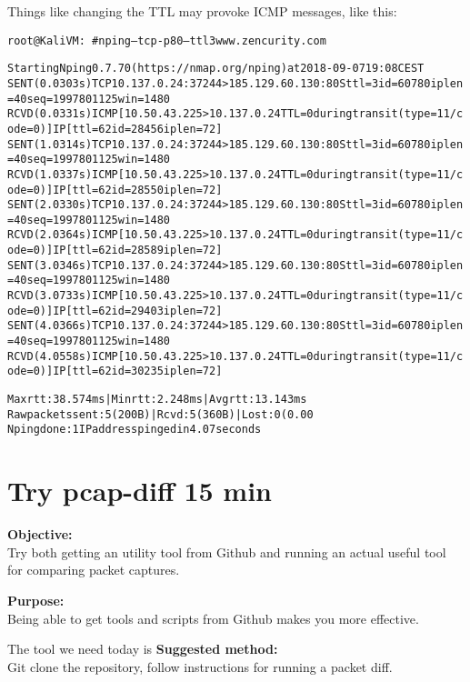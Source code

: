 \documentclass[a4paper,11pt,notitlepage]{report}
\begin{document}
\eject
Things like changing the TTL may provoke ICMP messages, like this:
\begin{alltt}\footnotesize
root@KaliVM:~# nping --tcp -p 80 --ttl 3 www.zencurity.com

Starting Nping 0.7.70 ( https://nmap.org/nping ) at 2018-09-07 19:08 CEST
SENT (0.0303s) TCP 10.137.0.24:37244 > 185.129.60.130:80 S ttl=3 id=60780 iplen=40  seq=1997801125 win=1480
RCVD (0.0331s) ICMP [10.50.43.225 > 10.137.0.24 TTL=0 during transit (type=11/code=0) ] IP [ttl=62 id=28456 iplen=72 ]
SENT (1.0314s) TCP 10.137.0.24:37244 > 185.129.60.130:80 S ttl=3 id=60780 iplen=40  seq=1997801125 win=1480
RCVD (1.0337s) ICMP [10.50.43.225 > 10.137.0.24 TTL=0 during transit (type=11/code=0) ] IP [ttl=62 id=28550 iplen=72 ]
SENT (2.0330s) TCP 10.137.0.24:37244 > 185.129.60.130:80 S ttl=3 id=60780 iplen=40  seq=1997801125 win=1480
RCVD (2.0364s) ICMP [10.50.43.225 > 10.137.0.24 TTL=0 during transit (type=11/code=0) ] IP [ttl=62 id=28589 iplen=72 ]
SENT (3.0346s) TCP 10.137.0.24:37244 > 185.129.60.130:80 S ttl=3 id=60780 iplen=40  seq=1997801125 win=1480
RCVD (3.0733s) ICMP [10.50.43.225 > 10.137.0.24 TTL=0 during transit (type=11/code=0) ] IP [ttl=62 id=29403 iplen=72 ]
SENT (4.0366s) TCP 10.137.0.24:37244 > 185.129.60.130:80 S ttl=3 id=60780 iplen=40  seq=1997801125 win=1480
RCVD (4.0558s) ICMP [10.50.43.225 > 10.137.0.24 TTL=0 during transit (type=11/code=0) ] IP [ttl=62 id=30235 iplen=72 ]

Max rtt: 38.574ms | Min rtt: 2.248ms | Avg rtt: 13.143ms
Raw packets sent: 5 (200B) | Rcvd: 5 (360B) | Lost: 0 (0.00%)
Nping done: 1 IP address pinged in 4.07 seconds
\end{alltt}


\chapter{Try pcap-diff 15 min}
\label{ex:pcap-diff}

{\bf Objective:}\\
Try both getting an utility tool from Github and running an actual useful tool for comparing packet captures.

{\bf Purpose:}\\
Being able to get tools and scripts from Github makes you more effective.

The tool we need today is 
{\bf Suggested method:}\\
Git clone the repository, follow instructions for running a packet diff.
\end{document}
